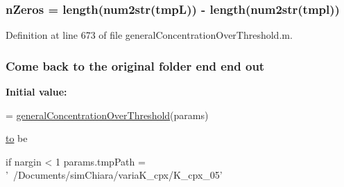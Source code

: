 \hypertarget{a00028_ac4353d99277795cadf898255e2c73c71}{
\subsubsection[{n\+Zeros}]{\setlength{\rightskip}{0pt plus 5cm}n\+Zeros = length(num2str(tmp\+L)) -\/ length(num2str(tmpl))}}\label{a00028_ac4353d99277795cadf898255e2c73c71}


Definition at line 673 of file general\+Concentration\+Over\+Threshold.\+m.

\hypertarget{a00028_a34c820385e9209f49c18739329ad9206}{
\subsubsection[{out}]{\setlength{\rightskip}{0pt plus 5cm}Come back {\bf to} the original folder {\bf end} {\bf end} out}}\label{a00028_a34c820385e9209f49c18739329ad9206}
{\bfseries Initial value\+:}
\begin{DoxyCode}
= \hyperlink{a00032_a56bd5c817530f9b305b5375d6509978a}{generalConcentrationOverThreshold}(params)

      \hyperlink{a00028_af71dbe52628a3f83a77ab494817525c6}{to} be 

\textcolor{keywordflow}{if} nargin < 1
    params.tmpPath = \textcolor{stringliteral}{'~/Documents/simChiara/variaK\_cpx/K\_cpx\_05'}
\end{DoxyCode}



